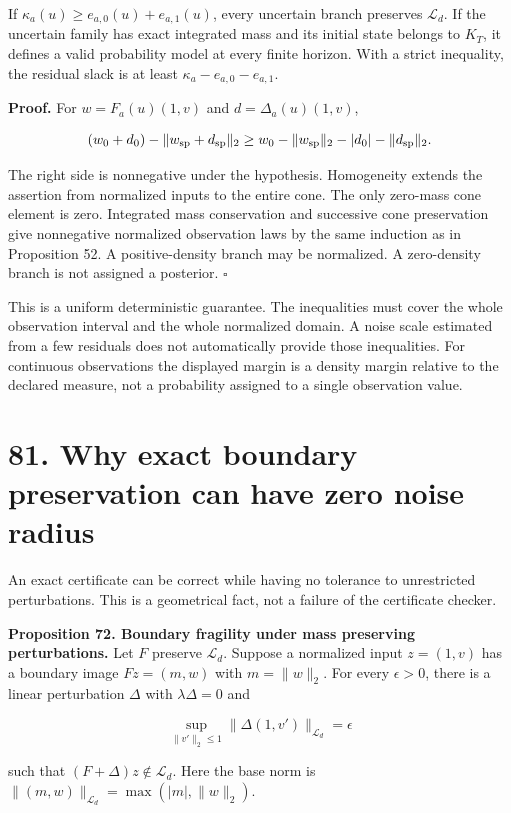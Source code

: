 \documentclass[11pt,letterpaper]{article}
\begin{document}
If \(\kappa_a(u)\geq e_{a,0}(u)+e_{a,1}(u)\), every uncertain branch
preserves \(\mathcal L_d\). If the uncertain family has exact integrated
mass and its initial state belongs to \(K_T\), it defines a valid
probability model at every finite horizon. With a strict inequality, the
residual slack is at least \(\kappa_a-e_{a,0}-e_{a,1}\).

\textbf{Proof.} For \(w=F_a(u)(1,v)\) and \(d=\Delta_a(u)(1,v)\),

\[
(w_0+d_0)-\|w_{\rm sp}+d_{\rm sp}\|_2
\geq w_0-\|w_{\rm sp}\|_2-|d_0|-\|d_{\rm sp}\|_2.
\]

The right side is nonnegative under the hypothesis. Homogeneity extends
the assertion from normalized inputs to the entire cone. The only
zero-mass cone element is zero. Integrated mass conservation and
successive cone preservation give nonnegative normalized observation
laws by the same induction as in Proposition 52. A positive-density
branch may be normalized. A zero-density branch is not assigned a
posterior. \(\square\)

This is a uniform deterministic guarantee. The inequalities must cover
the whole observation interval and the whole normalized domain. A noise
scale estimated from a few residuals does not automatically provide
those inequalities. For continuous observations the displayed margin is
a density margin relative to the declared measure, not a probability
assigned to a single observation value.

\section{81. Why exact boundary preservation can have zero noise
radius}\label{why-exact-boundary-preservation-can-have-zero-noise-radius}

An exact certificate can be correct while having no tolerance to
unrestricted perturbations. This is a geometrical fact, not a failure of
the certificate checker.

\textbf{Proposition 72. Boundary fragility under mass preserving
perturbations.} Let \(F\) preserve \(\mathcal L_d\). Suppose a
normalized input \(z=(1,v)\) has a boundary image \(Fz=(m,w)\) with
\(m=\|w\|_2\). For every \(\epsilon>0\), there is a linear perturbation
\(\Delta\) with \(\lambda\Delta=0\) and

\[
\sup_{\|v'\|_2\leq1}\|\Delta(1,v')\|_{\mathcal L_d}=\epsilon
\]

such that \((F+\Delta)z\notin\mathcal L_d\). Here the base norm is
\(\|(m,w)\|_{\mathcal L_d}=\max(|m|,\|w\|_2)\).
\end{document}
